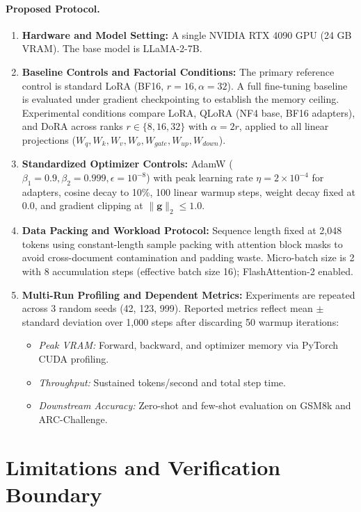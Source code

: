 \documentclass[11pt,a4paper]{article}
\begin{document}
\paragraph{Proposed Protocol.}
\begin{enumerate}
    \item \textbf{Hardware and Model Setting:} A single NVIDIA RTX 4090 GPU (24 GB VRAM). The base model is LLaMA-2-7B.
    \item \textbf{Baseline Controls and Factorial Conditions:} The primary reference control is standard LoRA (BF16, $r=16, \alpha=32$). A full fine-tuning baseline is evaluated under gradient checkpointing to establish the memory ceiling. Experimental conditions compare LoRA, QLoRA (NF4 base, BF16 adapters), and DoRA across ranks $r \in \{8, 16, 32\}$ with $\alpha = 2r$, applied to all linear projections ($W_q, W_k, W_v, W_o, W_{gate}, W_{up}, W_{down}$).
    \item \textbf{Standardized Optimizer Controls:} AdamW ($\beta_1 = 0.9, \beta_2 = 0.999, \epsilon = 10^{-8}$) with peak learning rate $\eta = 2 \times 10^{-4}$ for adapters, cosine decay to 10\%, 100 linear warmup steps, weight decay fixed at 0.0, and gradient clipping at $\|\mathbf{g}\|_2 \le 1.0$.
    \item \textbf{Data Packing and Workload Protocol:} Sequence length fixed at 2,048 tokens using constant-length sample packing with attention block masks to avoid cross-document contamination and padding waste. Micro-batch size is 2 with 8 accumulation steps (effective batch size 16); Flash\-Attention-2 enabled.
    \item \textbf{Multi-Run Profiling and Dependent Metrics:} Experiments are repeated across 3 random seeds (42, 123, 999). Reported metrics reflect mean $\pm$ standard deviation over 1,000 steps after discarding 50 warmup iterations:
    \begin{itemize}
        \item \emph{Peak VRAM:} Forward, backward, and optimizer memory via PyTorch CUDA profiling.
        \item \emph{Throughput:} Sustained tokens/second and total step time.
        \item \emph{Downstream Accuracy:} Zero-shot and few-shot evaluation on GSM8k and ARC-Challenge.
    \end{itemize}
\end{enumerate}

\section{Limitations and Verification Boundary}
\end{document}
